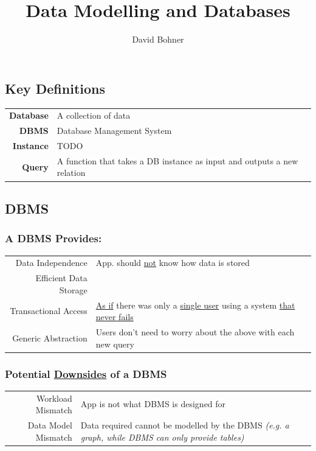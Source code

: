\documentclass{sciposter}
\title{\huge{Data Modelling and Databases}}
\author{David Bohner}
\begin{document}
\selectfont
\maketitle

\begin{multicols}{3}

\section{Key Definitions}
\begin{tabularx}{\linewidth}{r X}
\textbf{Database} & A collection of data\\
\textbf{DBMS} & Database Management System\\
\textbf{Instance} & TODO\\
\textbf{Query} & A function that takes a DB instance as input and outputs a new relation
\end{tabularx}
\subsection{DBMS}
\begin{mdframed}
\subsubsection{A DBMS Provides:}
\begin{tabularx}{\linewidth}{r|X}
Data Independence & App. should \underline{not} know how data is stored\\
Efficient Data Storage\\
Transactional Access & \underline{As if} there was only a \underline{single user} using a system \underline{that never fails}\\
Generic Abstraction & Users don't need to worry about the above with each new query
\end{tabularx}
\end{mdframed}

\begin{mdframed}
\subsubsection{Potential \underline{Downsides} of a DBMS}
\begin{tabularx}{\linewidth}{r|X}
Workload Mismatch & App is not what DBMS is designed for\\
Data Model Mismatch & Data required cannot be modelled by the DBMS \textit{(e.g. a graph, while DBMS can only provide tables)}
\end{tabularx}
\end{mdframed}


\end{multicols}
\end{document}
